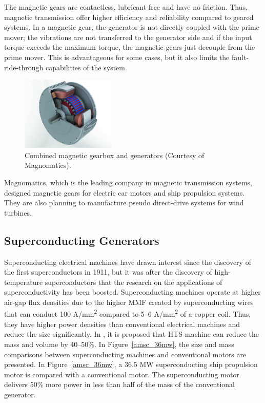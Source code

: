 \documentclass[a4paper, 11pt]{article} %
\begin{document}
The magnetic gears are contactless, lubricant-free and have no friction. Thus, magnetic transmission offer higher efficiency and reliability compared to geared systems. In a magnetic gear, the generator is not directly coupled with the prime mover; the vibrations are not transferred to the generator side and if the input torque exceeds the maximum torque, the magnetic gears just decouple from the prime mover. This is advantageous for some cases, but it also limits the fault-ride-through capabilities of the system.

  \begin{figure}[]
    \centering
    \includegraphics[width=0.4\textwidth]{magnomatics}
    \caption{Combined magnetic gearbox and generators (Courtesy of Magnomatics).} 
    \label{magnomatics}
  \end{figure}


Magnomatics, which is the leading company in magnetic transmission systems, designed magnetic gears for electric car motors and ship propulsion systems. They are also planning to manufacture pseudo direct-drive systems for wind turbines.

\subsection{Superconducting Generators}

Superconducting electrical machines have drawn interest since the discovery of the first superconductors in 1911, but it was after the discovery of high-temperature superconductors that the research on the applications of superconductivity has been boosted. Superconducting machines operate at higher air-gap flux densities due to the higher MMF created by superconducting wires that can conduct 100 A/mm\textsuperscript{2} compared to 5--6 A/mm\textsuperscript{2} of a copper coil. Thus, they have higher power densities than conventional
electrical machines and reduce the size significantly. In \cite{Klaus2006}, it is proposed that HTS machine can reduce the mass and volume by 40--50\%. In Figure~\ref{amsc_36mw}, the size and mass comparisons between superconducting machines and conventional motors are presented. In Figure~\ref{amsc_36mw}, a 36.5 MW superconducting ship propulsion motor is compared with a conventional motor. The superconducting motor delivers 50\% more power in less than half of the mass of the conventional generator.
\end{document}
